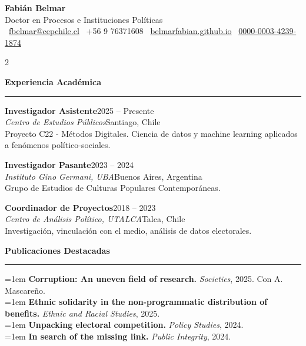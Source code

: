 \documentclass[10pt,a4paper]{article}
\newcommand{\cvsection}[1]{%
    \vspace{10pt}
    {\Large\bfseries\color{DarkBlue}#1}\\[-4pt]
    {\color{Golden}\rule{\linewidth}{2pt}}
    \vspace{6pt}
}
\newcommand{\cvevent}[4]{%
    \textbf{\color{DarkBlue}#1}\hfill{\footnotesize #3}\\
    \textit{#2}\hfill{\footnotesize #4}\\[2pt]
}
\newcommand{\cvpub}[1]{\noindent\hangindent=1em\hangafter=1 #1\\[4pt]}
\begin{document}
\begin{center}
{\Huge\bfseries Fabián Belmar}\\[6pt]
{\large\color{DarkBlue}Doctor en Procesos e Instituciones Políticas}\\[8pt]
{\footnotesize
\faEnvelope\ \href{mailto:fbelmar@cepchile.cl}{fbelmar@cepchile.cl} \quad
\faPhone\ +56 9 76371608 \quad
\faGlobe\ \href{https://belmarfabian.github.io}{belmarfabian.github.io} \quad
\faOrcid\ \href{https://orcid.org/0000-0003-4239-1874}{0000-0003-4239-1874}
}
\end{center}

\vspace{10pt}

\begin{paracol}{2}


\cvsection{Experiencia Académica}

\cvevent{Investigador Asistente}{Centro de Estudios Públicos}{2025 -- Presente}{Santiago, Chile}
Proyecto C22 - Métodos Digitales. Ciencia de datos y machine learning aplicados a fenómenos político-sociales.

\vspace{6pt}

\cvevent{Investigador Pasante}{Instituto Gino Germani, UBA}{2023 -- 2024}{Buenos Aires, Argentina}
Grupo de Estudios de Culturas Populares Contemporáneas.

\vspace{6pt}

\cvevent{Coordinador de Proyectos}{Centro de Análisis Político, UTALCA}{2018 -- 2023}{Talca, Chile}
Investigación, vinculación con el medio, análisis de datos electorales.

\cvsection{Publicaciones Destacadas}

\cvpub{\textbf{Corruption: An uneven field of research.} \textit{Societies}, 2025. Con A. Mascareño.}

\cvpub{\textbf{Ethnic solidarity in the non-programmatic distribution of benefits.} \textit{Ethnic and Racial Studies}, 2025.}

\cvpub{\textbf{Unpacking electoral competition.} \textit{Policy Studies}, 2024.}

\cvpub{\textbf{In search of the missing link.} \textit{Public Integrity}, 2024.}


\end{paracol}
\end{document}

